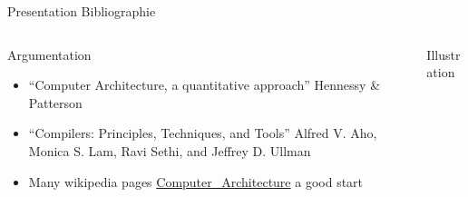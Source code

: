 %
\begin{Frame}{Presentation Bibliographie}
  \begin{columns}[t]
    \begin{column}{5cm} %
      \begin{block}{Argumentation}
        \begin{itemize}
        \item ``Computer Architecture, a quantitative approach''
          Hennessy \& Patterson
        \item ``Compilers: Principles, Techniques, and Tools'' Alfred
          V. Aho, Monica S. Lam, Ravi Sethi, and Jeffrey D. Ullman
        \item Many wikipedia pages
          \href{https://en.wikipedia.org/wiki/Computer_architecture}{Computer\_Architecture}
          a good start
        \end{itemize}
      \end{block} 
    \end{column}
    
    \begin{column}{5cm} %
      \begin{block}{Illustration}

      \end{block}   
    \end{column}
  \end{columns}  
\end{Frame}



